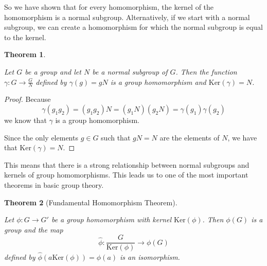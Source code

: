 \documentclass[
]{book}
\newtheorem{theorem}{Theorem}[chapter]
\theoremstyle{definition}
\theoremstyle{definition}
\theoremstyle{definition}
\theoremstyle{definition}
\theoremstyle{remark}
\begin{document}
So we have shown that for every homomorphism, the kernel of the homomorphism is a normal subgroup. Alternatively, if we start with a normal subgroup, we can create a homomorphism for which the normal subgroup is equal to the kernel.

\begin{theorem}
\protect\hypertarget{thm:unlabeled-div-230}{}\label{thm:unlabeled-div-230}

Let \(G\) be a group and let \(N\) be a normal subgroup of \(G\). Then the function \(\gamma: G \rightarrow \frac{G}{N}\) defined by \(\gamma(g)=gN\) is a group homomorphism and \(\mbox{Ker}(\gamma) = N\).

\end{theorem}

\begin{proof}

Because \[\gamma(g_1 g_2) = (g_1 g_2) N = \left(g_1 N\right) \left(g_2 N\right) = \gamma(g_1) \gamma(g_2)\] we know that \(\gamma\) is a group homomorphism.

Since the only elements \(g \in G\) such that \(gN=N\) are the elements of \(N\), we have that \(\mbox{Ker}(\gamma)=N\).

\end{proof}

This means that there is a strong relationship between normal subgroups and kernels of group homomorphisms. This leads us to one of the most important theorems in basic group theory.

\begin{theorem}[Fundamental Homomorphism Theorem]
\protect\hypertarget{thm:unlabeled-div-232}{}\label{thm:unlabeled-div-232}

Let \(\phi: G \rightarrow G'\) be a group homomorphism with kernel \(\mbox{Ker}(\phi)\). Then \(\phi(G)\) is a group and the map
\[\hat{\phi} : \frac{G}{\mbox{Ker}(\phi)} \rightarrow \phi(G)\] defined by \(\hat{\phi} \left( a \mbox{Ker}(\phi)\right) = \phi(a)\) is an isomorphism.

\end{theorem}
\end{document}
